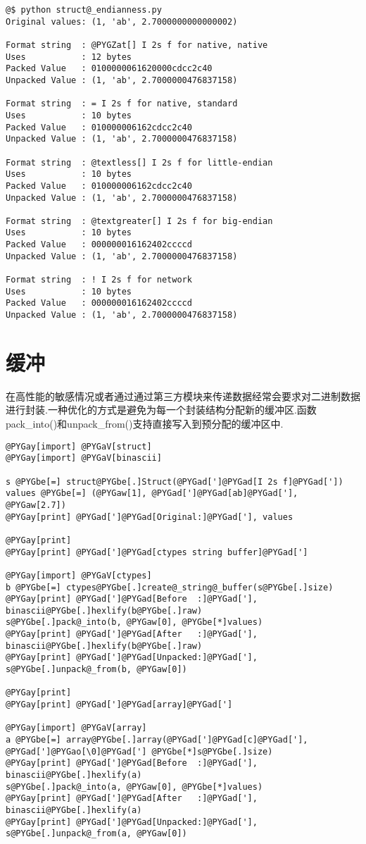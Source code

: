 \documentclass[a4paper,10pt,english]{manual}
\begin{document}
\begin{Verbatim}[commandchars=@\[\]]
@$ python struct@_endianness.py
Original values: (1, 'ab', 2.7000000000000002)

Format string  : @PYGZat[] I 2s f for native, native
Uses           : 12 bytes
Packed Value   : 0100000061620000cdcc2c40
Unpacked Value : (1, 'ab', 2.7000000476837158)

Format string  : = I 2s f for native, standard
Uses           : 10 bytes
Packed Value   : 010000006162cdcc2c40
Unpacked Value : (1, 'ab', 2.7000000476837158)

Format string  : @textless[] I 2s f for little-endian
Uses           : 10 bytes
Packed Value   : 010000006162cdcc2c40
Unpacked Value : (1, 'ab', 2.7000000476837158)

Format string  : @textgreater[] I 2s f for big-endian
Uses           : 10 bytes
Packed Value   : 000000016162402ccccd
Unpacked Value : (1, 'ab', 2.7000000476837158)

Format string  : ! I 2s f for network
Uses           : 10 bytes
Packed Value   : 000000016162402ccccd
Unpacked Value : (1, 'ab', 2.7000000476837158)
\end{Verbatim}


\section{缓冲}

在高性能的敏感情况或者通过通过第三方模块来传递数据经常会要求对二进制数据进行封装.一种优化的方式是避免为每一个封装结构分配新的缓冲区.函数pack\_into()和unpack\_from()支持直接写入到预分配的缓冲区中.

\begin{Verbatim}[commandchars=@\[\]]
@PYGay[import] @PYGaV[struct]
@PYGay[import] @PYGaV[binascii]

s @PYGbe[=] struct@PYGbe[.]Struct(@PYGad[']@PYGad[I 2s f]@PYGad['])
values @PYGbe[=] (@PYGaw[1], @PYGad[']@PYGad[ab]@PYGad['], @PYGaw[2.7])
@PYGay[print] @PYGad[']@PYGad[Original:]@PYGad['], values

@PYGay[print]
@PYGay[print] @PYGad[']@PYGad[ctypes string buffer]@PYGad[']

@PYGay[import] @PYGaV[ctypes]
b @PYGbe[=] ctypes@PYGbe[.]create@_string@_buffer(s@PYGbe[.]size)
@PYGay[print] @PYGad[']@PYGad[Before  :]@PYGad['], binascii@PYGbe[.]hexlify(b@PYGbe[.]raw)
s@PYGbe[.]pack@_into(b, @PYGaw[0], @PYGbe[*]values)
@PYGay[print] @PYGad[']@PYGad[After   :]@PYGad['], binascii@PYGbe[.]hexlify(b@PYGbe[.]raw)
@PYGay[print] @PYGad[']@PYGad[Unpacked:]@PYGad['], s@PYGbe[.]unpack@_from(b, @PYGaw[0])

@PYGay[print]
@PYGay[print] @PYGad[']@PYGad[array]@PYGad[']

@PYGay[import] @PYGaV[array]
a @PYGbe[=] array@PYGbe[.]array(@PYGad[']@PYGad[c]@PYGad['], @PYGad[']@PYGao[\0]@PYGad['] @PYGbe[*]s@PYGbe[.]size)
@PYGay[print] @PYGad[']@PYGad[Before  :]@PYGad['], binascii@PYGbe[.]hexlify(a)
s@PYGbe[.]pack@_into(a, @PYGaw[0], @PYGbe[*]values)
@PYGay[print] @PYGad[']@PYGad[After   :]@PYGad['], binascii@PYGbe[.]hexlify(a)
@PYGay[print] @PYGad[']@PYGad[Unpacked:]@PYGad['], s@PYGbe[.]unpack@_from(a, @PYGaw[0])
\end{Verbatim}
\end{document}
